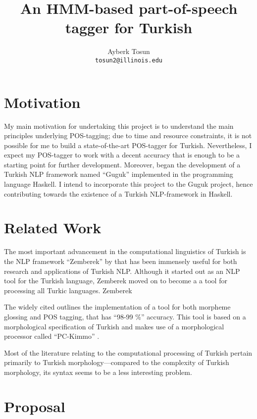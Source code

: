 \documentclass{article}
\title{\bf An HMM-based part-of-speech tagger for Turkish}
\author{Ayberk Tosun\\\texttt{tosun2@illinois.edu}}
\date{}
\begin{document}
\maketitle

\section{Motivation}
\label{sec:motivation}
My main motivation for undertaking this project is to understand the main
principles underlying POS-tagging; due to time and resource constraints, it is
not possible for me to build a state-of-the-art POS-tagger for
Turkish. Nevertheless, I expect my POS-tagger
to work with a decent accuracy that is enough to be a starting point for
further development. Moreover, \citet{Korkut2015} began the development of a
Turkish NLP framework named ``Guguk'' implemented in the programming language Haskell. I intend
to incorporate this project to the Guguk project, hence contributing towards
the existence of a Turkish NLP-framework in Haskell.

\section{Related Work}
\label{sec:related_work}

The most important advancement in the computational linguistics of Turkish is
the NLP framework ``Zemberek'' by \citet{akin2007zemberek} that has been
immensely useful for both research and applications of Turkish NLP. Although it started
out as an NLP tool for the Turkish language, Zemberek moved on to become a
a tool for processing all Turkic languages. Zemberek

The widely cited \citet{oflazer1994tagging} outlines the implementation of a
tool for both morpheme glossing and POS tagging, that has ``98-99 \%'' accuracy. This
tool is based on a morphological specification of Turkish and makes use of a
morphological processor called ``PC-Kimmo'' \citep{antworth1991pc}.

Most of the literature relating to the computational processing of Turkish
pertain primarily to Turkish morphology---compared to the complexity of Turkish
morphology, its syntax seems to be a less interesting problem.
\section{Proposal}
\end{document}

